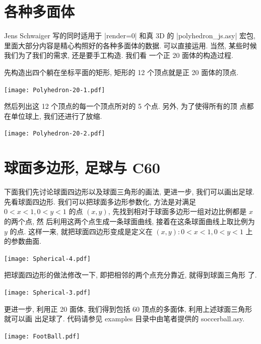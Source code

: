 \documentclass[nofonts,CJKnormalspaces]{ctexbook}
\begin{document}
\section{各种多面体}
Jens Schwaiger 写的同时适用于 |render=0| 和真 3D 的
|polyhedron_js.asy| 宏包, 里面大部分内容是精心构照好的各种多面体的数据.
可以直接运用. 当然, 某些时候我们为了我们的需求, 还是要手工构造. 我们看
一个正 20 面体的构造过程.

先构造出四个躺在坐标平面的矩形, 矩形的 12 个顶点就是正 20 面体的顶点.
\begin{center}\texttt{[image: Polyhedron-20-1.pdf]}\end{center}%


然后列出这 12 个顶点的每一个顶点所对的 5 个点. 另外, 为了使得所有的顶
点都在单位球上, 我们还进行了放缩.
\begin{center}\texttt{[image: Polyhedron-20-2.pdf]}\end{center}%



\section{球面多边形, 足球与 C60}
下面我们先讨论球面四边形以及球面三角形的画法, 更进一步, 我们可以画出足球.
先看球面四边形. 我们可以把球面多边形参数化, 方法是对满足 $0<x<1,0<y<1$
的点 $(x,y)$, 先找到相对于球面多边形一组对边比例都是 $x$ 的两个点, 然
后利用这两个点生成一条球面曲线, 接着在这条球面曲线上取比例为 $y$ 的点.
这样一来, 就把球面四边形变成是定义在 $(x,y) : 0<x<1,0<y<1$ 上的参数曲面.
\begin{center}\texttt{[image: Spherical-4.pdf]}\end{center}%


把球面四边形的做法修改一下, 即把相邻的两个点充分靠近, 就得到球面三角形
了.
\begin{center}\texttt{[image: Spherical-3.pdf]}\end{center}%

更进一步, 利用正 20 面体, 我们得到包括 60 顶点的多面体, 利用上述球面三角形就可以画
出足球了. 代码请参见 examples 目录中由笔者提供的 soccerball.asy.
\begin{center}\texttt{[image: FootBall.pdf]}\end{center}%
\end{document}
